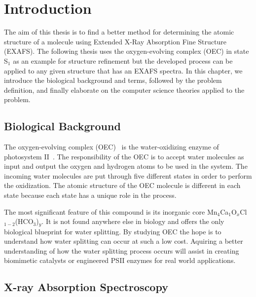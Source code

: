 \chapter{Introduction}

The aim of this thesis is to find a better method for determining the atomic structure of a molecule using Extended X-Ray Absorption Fine Structure (EXAFS). The following thesis uses the oxygen-evolving complex (OEC) in state S$_{1}$ as an example for structure refinement but the developed process can be applied to any given structure that has an EXAFS spectra. In this chapter, we introduce the biological background and terms, followed by the problem definition, and finally elaborate on the computer science theories applied to the problem.

\section{Biological Background}

The oxygen-evolving complex (OEC)~\cite{yano2006manganese} is the water-oxidizing enzyme of photosystem II~\cite{oxygenicPhotosynthesis}. The responsibility of the OEC is to accept water molecules as input and output the oxygen and hydrogen atoms to be used in the system. The incoming water molecules are put through five different states in order to perform the oxidization. The atomic structure of the OEC molecule is different in each state because each state has a unique role in the process.

The most significant feature of this compound is its inorganic core Mn$_{4}$Ca$_{1}$O$_{x}$Cl$_{1-2}$(HCO$_{3}$)$_{y}$. It is not found anywhere else in biology and offers the only biological blueprint for water splitting. By studying OEC the hope is to understand how water splitting can occur at such a low cost. Aquiring a better understanding of how the water splitting process occurs will assist in creating biomimetic catalysts or engineered PSII enzymes for real world applications.


\section{X-ray Absorption Spectroscopy}

